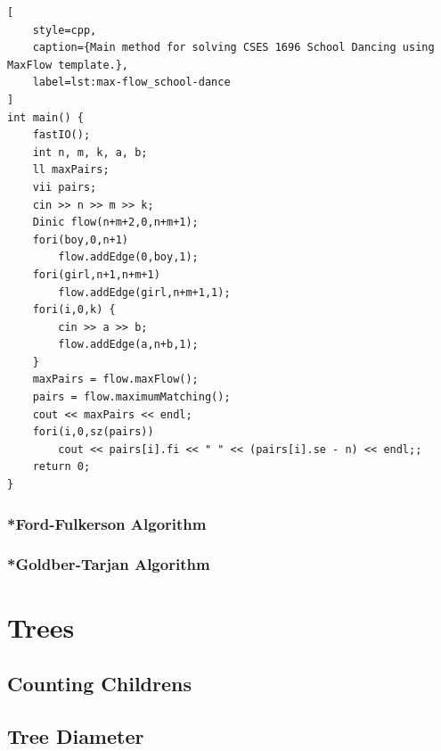 \documentclass[letterpaper,landscape]{article}
\begin{document}
\begin{lstlisting}[
    style=cpp,
    caption={Main method for solving CSES 1696 School Dancing using MaxFlow template.},
    label=lst:max-flow_school-dance
]
int main() {
    fastIO();
    int n, m, k, a, b;
    ll maxPairs;
    vii pairs;
    cin >> n >> m >> k;
    Dinic flow(n+m+2,0,n+m+1);
    fori(boy,0,n+1)
        flow.addEdge(0,boy,1);
    fori(girl,n+1,n+m+1)
        flow.addEdge(girl,n+m+1,1);
    fori(i,0,k) {
        cin >> a >> b;
        flow.addEdge(a,n+b,1);
    }
    maxPairs = flow.maxFlow();
    pairs = flow.maximumMatching();
    cout << maxPairs << endl;
    fori(i,0,sz(pairs))
        cout << pairs[i].fi << " " << (pairs[i].se - n) << endl;;
    return 0;
}
\end{lstlisting}

\subsubsection{*Ford-Fulkerson Algorithm}

\subsubsection{*Goldber-Tarjan Algorithm}

\section{Trees}

\subsection{Counting Childrens}



\subsection{Tree Diameter}



\end{document}
